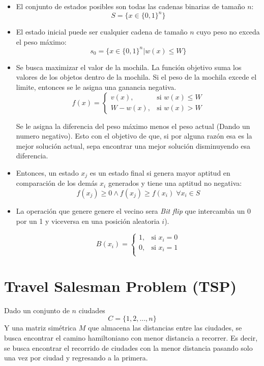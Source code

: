 \begin{itemize}
	\item El conjunto de estados posibles son todas las cadenas binarias de tamaño $n$: \[ S = \{ x \in \{ 0, 1  \}^n \} \]
	
	\item El estado inicial puede ser cualquier cadena de tamaño $n$ cuyo peso no exceda el peso máximo: \[ s_0 = \{x \in \{0,1\}^n | w(x) \leq W \} \]
	
	\item Se busca maximizar el valor de la mochila. La función objetivo suma los valores de los objetos dentro de la mochila. Si el peso de la mochila excede el limite, entonces se le asigna una ganancia negativa. 
	\[
	f(x) =
	\begin{cases} 
		v(x), & \text{si } w(x) \leq W \\ 
		W - w(x), & \text{si } w(x) > W
	\end{cases}
	\]
	
	Se le asigna la diferencia del peso máximo menos el peso actual (Dando un numero negativo). Esto con el objetivo de que, si por alguna razón esa es la mejor solución actual, sepa encontrar una mejor solución disminuyendo esa diferencia.
	
	\item Entonces, un estado $x_j$ es un estado final si genera mayor aptitud en comparación de los demás $x_i$ generados y tiene una aptitud no negativa: \[ f(x_j) \geq 0 \land f(x_j) \geq f(x_i) \; \forall x_i \in S\]
	
	\item La operación que genere genere el vecino sera \textit{Bit flip} que intercambia un 0 por un 1 y viceversa en una posición aleatoria $i$).
	
	\[
	B(x_i) =
	\begin{cases} 
		1, & \text{si } x_i = 0 \\ 
		0, & \text{si } x_i = 1 \\
	\end{cases}
	\]
	
\end{itemize}

\section{Travel Salesman Problem (TSP)}

Dado un conjunto de $n$ ciudades \[ C = \{1,2, \dots , n\} \] Y una matriz simétrica $M$ que almacena las distancias entre las ciudades, se busca encontrar el camino hamiltoniano con menor distancia a recorrer. Es decir, se busca encontrar el recorrido de ciudades con la menor distancia pasando solo una vez por ciudad y regresando a la primera.

